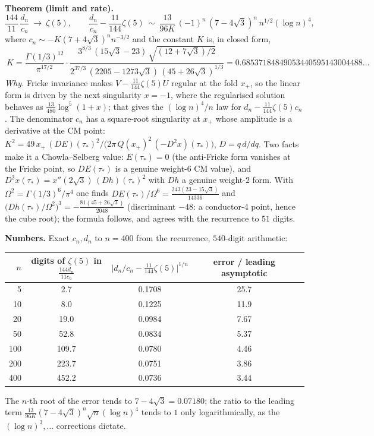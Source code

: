 \documentclass[10pt]{article}
\begin{document}
\textbf{Theorem (limit and rate).}
\[
\frac{144}{11}\,\frac{d_n}{c_n}\ \longrightarrow\ \zeta(5),\qquad
\frac{d_n}{c_n}-\frac{11}{144}\zeta(5)\ \sim\ \frac{13}{96K}\,(-1)^n\,(7-4\sqrt3)^n\,n^{1/2}(\log n)^4,
\]
where $c_n\sim-K(7+4\sqrt3)^nn^{-3/2}$ and the constant $K$ is, in closed form,
\[
\boxed{\ K=\frac{\Gamma(1/3)^{12}}{\pi^{17/2}}\cdot\frac{3^{8/3}\,(15\sqrt3-23)\,\sqrt{(12+7\sqrt3)/2}}{2^{37/3}\,(2205-1273\sqrt3)\,(45+26\sqrt3)^{1/3}}=0.68537184849053440595143004488\ldots\ }
\]
\emph{Why.} Fricke invariance makes $V-\frac{11}{144}\zeta(5)U$ regular at the fold $x_+$, so the linear form is driven by the next singularity $x=-1$, where the regularised solution behaves as $\frac{13}{480}\log^5(1+x)$; that gives the $(\log n)^4/n$ law for $d_n-\frac{11}{144}\zeta(5)c_n$. The denominator $c_n$ has a square-root singularity at $x_+$ whose amplitude is a derivative at the CM point: $K^2=49\,x_+\,(DE)(\tau_*)^2\big/\bigl(2\pi\,Q(x_+)^2\,(-D^2x)(\tau_*)\bigr)$, $D=q\,d/dq$. Two facts make it a Chowla--Selberg value: $E(\tau_*)=0$ (the anti-Fricke form vanishes at the Fricke point, so $DE(\tau_*)$ is a genuine weight-$6$ CM value), and $D^2x(\tau_*)=x''(2\sqrt3)\,(Dh)(\tau_*)^2$ with $Dh$ a genuine weight-$2$ form. With $\Omega^2=\Gamma(1/3)^6/\pi^4$ one finds $DE(\tau_*)/\Omega^6=\frac{243(23-15\sqrt3)}{14336}$ and $\bigl(Dh(\tau_*)/\Omega^2\bigr)^3=-\frac{81(45+26\sqrt3)}{2048}$ (discriminant $-48$: a conductor-$4$ point, hence the cube root); the formula follows, and agrees with the recurrence to $51$ digits.

\textbf{Numbers.} Exact $c_n,d_n$ to $n=400$ from the recurrence, $540$-digit arithmetic:
\begin{center}\small
\begin{tabular}{@{}rcccc@{}}\toprule
$n$ & digits of $\zeta(5)$ in $\frac{144d_n}{11c_n}$ & $\lvert d_n/c_n-\tfrac{11}{144}\zeta(5)\rvert^{1/n}$ & error / leading asymptotic \\\midrule
5 & 2.7 & 0.1708 & 25.7\\
10 & 8.0 & 0.1225 & 11.9\\
20 & 19.0 & 0.0984 & 7.67\\
50 & 52.8 & 0.0834 & 5.37\\
100 & 109.7 & 0.0780 & 4.46\\
200 & 223.7 & 0.0751 & 3.86\\
400 & 452.2 & 0.0736 & 3.44\\\bottomrule
\end{tabular}
\end{center}
The $n$-th root of the error tends to $7-4\sqrt3=0.07180$; the ratio to the leading term $\frac{13}{96K}(7-4\sqrt3)^n\sqrt n(\log n)^4$ tends to $1$ only logarithmically, as the $(\log n)^3,\dots$ corrections dictate.
\end{document}

